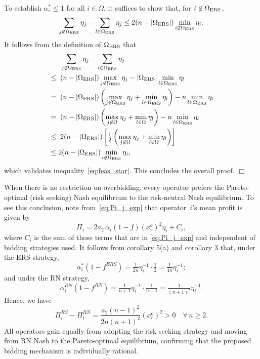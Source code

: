 \documentclass[conference]{IEEEtran}
\begin{document}
To establish $\alpha_i^*\le1$ for all $i\in\Omega$, it suffices to show that, for $i\not\in\Omega_{\rm ERS}$,
\begin{equation}
    \sum_{j\not\in\Omega_{\rm ERS}}\eta_j-\sum_{l\in\Omega_{\rm ERS}}\eta_j
    \leq 2(n-|\Omega_{\rm ERS}|)\min_{i\not\in\Omega_{\rm ERS}}\eta_i.
    \label{eq:feas_star}
\end{equation}
It follows from the definition of $\Omega_{\rm ERS}$ that
\[
\begin{aligned}
    & \; \sum_{j\not\in\Omega_{\rm ERS}}\eta_j-\sum_{l\in\Omega_{\rm ERS}}\eta_j \\
    \;\le\; & \; (n-|\Omega_{\rm ERS}|)\max_{j\not\in\Omega_{\rm ERS}}\eta_j -|\Omega_{\rm ERS}|\min_{l\in \Omega_{\rm ERS}}\eta_l\\
    \;=\; & \; (n-|\Omega_{\rm ERS}|)\left(\max_{j\not\in\Omega_{\rm ERS}}\eta_j+\min_{l\in\Omega_{\rm ERS}}\eta_l\right) -n\min_{l\in \Omega_{\rm ERS}}\eta_l\\
    \;=\; & \; (n-|\Omega_{\rm ERS}|)\left(\max_{j\not\in\Omega}\eta_j+\min_{l\in\Omega}\eta_l\right) -n\min_{l\in \Omega_{\rm ERS}}\eta_l\\
     \;\leq \; & \; 2(n-|\Omega_{\rm ERS}|)\left[\tfrac12 \left(\max_{j\not\in\Omega}\eta_j+\min_{l\in\Omega}\eta_l\right) \right]\\
     \;\leq \; & 2(n-|\Omega_{\rm ERS}|)\min_{i\not\in\Omega_{\rm ERS}}\eta_i,
\end{aligned}
\]
which validates inequality~\eqref{eq:feas_star}. This concludes the overall proof. \hfill $\Box$

When there is no restriction on overbidding, every operator prefers the Pareto-optimal (risk seeking) Nash equilibrium to the risk-neutral Nash equilibrium. To see this conclusion, note from~\eqref{eq:Pi_j_exp} that operator~$i$'s mean profit is given by 
\[ \Pi_i = 2a_2\,\alpha_i(1-f)(x_r^o)^2\eta_i + C_i, \]
where $C_i$ is the sum of those terms that are in \eqref{eq:Pi_j_exp} and independent of bidding strategies used. It follows from corollary 5(a) and corollary 3 that, under the ERS strategy, 
\[ \alpha_i^*(1-f^{ERS}) = \tfrac{1}{2n}\eta_i^{-1}\cdot\tfrac{1}{2} = \tfrac{1}{4n}\eta_i^{-1}; \] 
and under the RN strategy, 
\[ \alpha_i^{RN}(1-f^{RN}) = \tfrac{1}{n+1}\eta_i^{-1}\cdot\tfrac{1}{n+1} = \tfrac{1}{(n+1)^2}\eta_i^{-1}.\] 
Hence, we have
\[
\Pi_i^{RS} - \Pi_i^{RN} = \frac{a_2(n-1)^2}{2n(n+1)^2} (x_r^o)^2 > 0 \quad \forall\, n \geq 2.
\]
All operators gain equally from adopting the risk seeking strategy and moving from RN Nash to the Pareto-optimal equilibrium, confirming that the proposed bidding mechanism is individually rational. %
\end{document}
